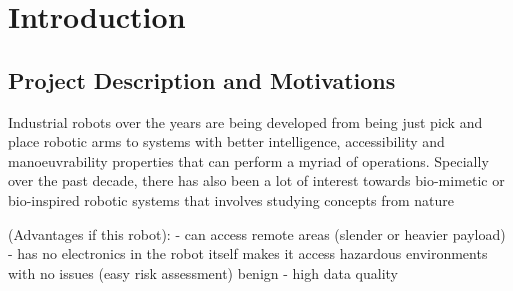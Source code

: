 \documentclass[a4paper,12pt]{report}
\begin{document}
\pagebreak



\tableofcontents

\pagebreak

\begin{abstract}
    \ldots
    
\end{abstract}

\chapter{Introduction}
\section{Project Description and Motivations}
Industrial robots over the years are being developed from being just pick and place robotic arms to systems with better intelligence, accessibility and manoeuvrability properties that can perform a myriad of operations. Specially over the past decade, there has also been a lot of interest towards bio-mimetic or bio-inspired robotic systems that involves studying concepts from nature  

(Advantages if this robot):
- can access remote areas (slender or heavier payload)
- has no electronics in the robot itself makes it access hazardous environments with no issues (easy risk assessment) benign 
- high data quality 
\end{document}
